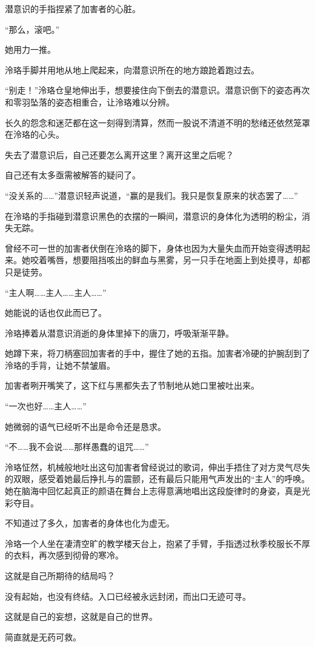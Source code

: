 \documentclass[UTF8, scheme = chinese, openany]{ctexbook}
\begin{document}
潜意识的手指捏紧了加害者的心脏。

“那么，滚吧。”

她用力一推。

泠珞手脚并用地从地上爬起来，向潜意识所在的地方踉跄着跑过去。

“别走！”泠珞仓皇地伸出手，想要接住向下倒去的潜意识。潜意识倒下的姿态再次和零羽坠落的姿态相重合，让泠珞难以分辨。

长久的怨念和迷茫都在这一刻得到清算，然而一股说不清道不明的愁绪还依然笼罩在泠珞的心头。

失去了潜意识后，自己还要怎么离开这里？离开这里之后呢？

自己还有太多亟需被解答的疑问了。

“没关系的……”潜意识轻声说道，“赢的是我们。我只是恢复原来的状态罢了……”

在泠珞的手指碰到潜意识黑色的衣摆的一瞬间，潜意识的身体化为透明的粉尘，消失无踪。

曾经不可一世的加害者伏倒在泠珞的脚下，身体也因为大量失血而开始变得透明起来。她咬着嘴唇，想要阻挡咳出的鲜血与黑雾，另一只手在地面上到处摸寻，却都只是徒劳。

“主人啊……主人……主人……”

她能说的话也仅此而已了。

泠珞捧着从潜意识消逝的身体里掉下的唐刀，呼吸渐渐平静。

她蹲下来，将刀柄塞回加害者的手中，握住了她的五指。加害者冷硬的护腕刮到了泠珞的手背，让她不禁皱眉。

加害者咧开嘴笑了，这下红与黑都失去了节制地从她口里被吐出来。

“一次也好……主人……”

她微弱的语气已经听不出是命令还是恳求。

“不……我不会说……那样愚蠢的诅咒……”

泠珞怔然，机械般地吐出这句加害者曾经说过的歌词，伸出手捂住了对方灵气尽失的双眼，感受着她最后挣扎与的震颤，还有最后只能用气声发出的“主人”的呼唤。她在脑海中回忆起真正的颜语在舞台上志得意满地唱出这段旋律时的身姿，真是光彩夺目。

不知道过了多久，加害者的身体也化为虚无。

泠珞一个人坐在凄清空旷的教学楼天台上，抱紧了手臂，手指透过秋季校服长不厚的衣料，再次感到彻骨的寒冷。

这就是自己所期待的结局吗？

没有起始，也没有终结。入口已经被永远封闭，而出口无迹可寻。

这就是自己的妄想，这就是自己的世界。

简直就是无药可救。
\end{document}
